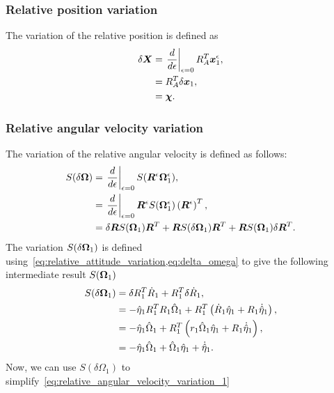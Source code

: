 \subsubsection{Relative position variation}
The variation of the relative position is defined as
\begin{align}\label{eq:relative_position_variation}
    \delta \bm{X} &= \left. \frac{d }{d \epsilon} \right|_{\epsilon=0} R_A^T \bm{x}_1^\epsilon ,\nonumber \\
     &= R_A^T \delta \bm{x}_1 , \nonumber\\
     &= \bm{\chi} .
\end{align}

\subsubsection{Relative angular velocity variation}
The variation of the relative angular velocity is defined as follows:
\begin{align}\label{eq:relative_angular_velocity_variation_1}
    S(\delta \bm{\Omega}) &= \left. \frac{d }{d \epsilon} \right|_{\epsilon=0} S(\bm{R}^\epsilon  \bm{\Omega}^\epsilon_1) , \nonumber\\
    &= \left. \frac{d }{d \epsilon} \right|_{\epsilon=0} \bm{R}^\epsilon S(\bm{\Omega}^\epsilon_1)  \left( \bm{R}^\epsilon \right)^T, \nonumber\\
    &= \delta \bm{R} S(\bm{\Omega}_1) \bm{R}^T  + \bm{R} S(\delta \bm{\Omega}_1) \bm{R}^T + \bm{R} S(\bm{\Omega}_1) \delta \bm{R}^T .
\end{align}
The variation \( S(\delta \bm{\Omega}_1)\) is defined using~\cref{eq:relative_attitude_variation,eq:delta_omega} to give the following intermediate result \(S(\bm{\Omega}_1)\)
\begin{align*}
    S(\delta \bm{\Omega}_1) &= \delta R_1^T \dot{R}_1 + R_1^T \delta \dot{R}_1 , \\
                            &= -\hat{\eta}_1 R_1^T R_1 \hat{\Omega}_1 + R_1^T \left( \dot{R}_1 \hat{\eta}_1 + R_1 \dot{\hat{\eta}}_1 \right) , \\
                            &= -\hat{\eta}_1 \hat{\Omega}_1 + R_1^T \left( r_1 \hat{\Omega}_1 \hat{\eta}_1 + R_1 \dot{\hat{\eta}}_1  \right) , \\
                            &= - \hat{\eta}_1 \hat{\Omega}_1 + \hat{\Omega}_1 \hat{\eta}_1 + \dot{\hat{\eta}}_1 .
\end{align*}
Now, we can use \(S(\delta \Omega_1) \) to simplify~\cref{eq:relative_angular_velocity_variation_1}
